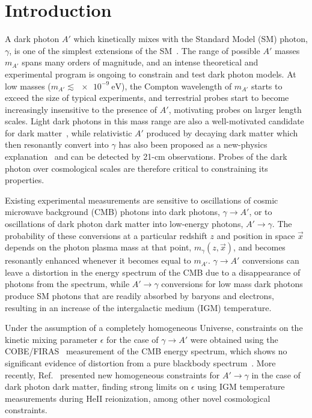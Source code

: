 \documentclass[prd,aps,10pt,nofootinbib,twocolumn,superscriptaddress,preprintnumbers,balancelastpage,longbibliography]{revtex4-1}
\begin{document}
\section{Introduction}

A dark photon $A'$ which kinetically mixes with the Standard Model (SM) photon, $\gamma$, is one of the simplest extensions of the SM~\cite{Holdom:1985ag}. 
The range of possible $A'$ masses $m_{A'}$ spans many orders of magnitude, and an intense theoretical and experimental program is ongoing to constrain and test dark photon models. 
At low masses ($m_{A'} \lesssim \SI{e-9}{\eV}$), the Compton wavelength of $m_{A'}$ starts to exceed the size of typical experiments, and terrestrial probes start to become increasingly insensitive to the presence of $A'$, motivating probes on larger length scales.
Light dark photons in this mass range are also a well-motivated candidate for dark matter~\cite{Redondo:2008ec,Nelson:2011sf,Arias:2012az,Fradette:2014sza,An:2014twa,Graham:2015rva,Agrawal:2018vin,Dror:2018pdh,Co:2018lka,Bastero-Gil:2018uel,Long:2019lwl}, while relativistic $A'$ produced by decaying dark matter which then resonantly convert into $\gamma$ has also been proposed as a new-physics explanation~\cite{Pospelov:2018kdh,Choi:2019jwx} and can be detected by 21-cm observations. Probes of the dark photon over cosmological scales are therefore critical to constraining its properties.

Existing experimental measurements are sensitive to oscillations of cosmic microwave background (CMB) photons into dark photons, $\gamma \to A'$, or to oscillations of dark photon dark matter into low-energy photons, $A' \to \gamma$. 
The probability of these conversions at a particular redshift $z$ and position in space $\vec{x}$ depends on the photon plasma mass at that point, $m_\gamma(z,\vec{x})$, and becomes resonantly enhanced whenever it becomes equal to $m_{A'}$.  
$\gamma \to A'$ conversions can leave a distortion in the energy spectrum of the CMB due to a disappearance of photons from the spectrum, while $A' \to \gamma$ conversions for low mass dark photons produce SM photons that are readily absorbed by baryons and electrons, resulting in an increase of the intergalactic medium (IGM) temperature.

Under the assumption of a completely homogeneous Universe, constraints on the kinetic mixing parameter $\epsilon$ for the case of $\gamma \to A'$ were obtained using the COBE/FIRAS~\cite{Fixsen:1996nj} measurement of the CMB energy spectrum, which shows no significant evidence of distortion from a pure blackbody spectrum~\cite{Mirizzi:2009iz,Kunze:2015noa}. More recently, Ref.~\cite{McDermott:2019lch} presented new homogeneous constraints for $A' \to \gamma$ in the case of dark photon dark matter, finding strong limits on $\epsilon$ using IGM temperature measurements during HeII reionization, among other novel cosmological constraints.    
\end{document}
